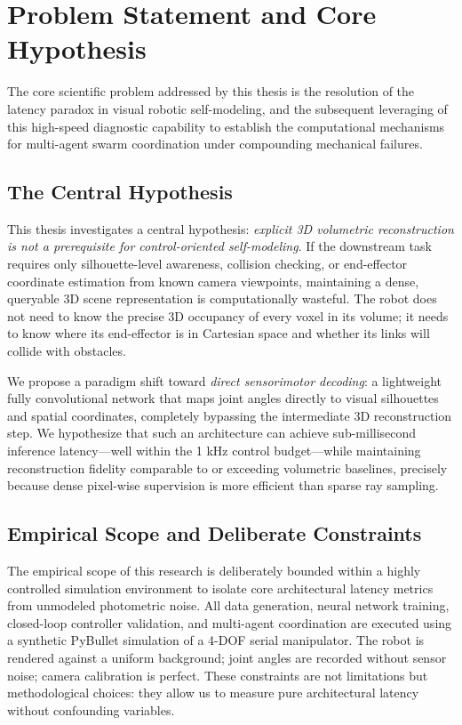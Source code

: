 \documentclass[12pt,a4paper,oneside]{report}
\begin{document}
\section{Problem Statement and Core Hypothesis}

The core scientific problem addressed by this thesis is the resolution of the latency paradox in visual robotic self-modeling, and the subsequent leveraging of this high-speed diagnostic capability to establish the computational mechanisms for multi-agent swarm coordination under compounding mechanical failures.

\subsection{The Central Hypothesis}

This thesis investigates a central hypothesis: \textit{explicit 3D volumetric reconstruction is not a prerequisite for control-oriented self-modeling}. If the downstream task requires only silhouette-level awareness, collision checking, or end-effector coordinate estimation from known camera viewpoints, maintaining a dense, queryable 3D scene representation is computationally wasteful. The robot does not need to know the precise 3D occupancy of every voxel in its volume; it needs to know where its end-effector is in Cartesian space and whether its links will collide with obstacles.

We propose a paradigm shift toward \textit{direct sensorimotor decoding}: a lightweight fully convolutional network that maps joint angles directly to visual silhouettes and spatial coordinates, completely bypassing the intermediate 3D reconstruction step. We hypothesize that such an architecture can achieve sub-millisecond inference latency—well within the 1 kHz control budget—while maintaining reconstruction fidelity comparable to or exceeding volumetric baselines, precisely because dense pixel-wise supervision is more efficient than sparse ray sampling.

\subsection{Empirical Scope and Deliberate Constraints}

The empirical scope of this research is deliberately bounded within a highly controlled simulation environment to isolate core architectural latency metrics from unmodeled photometric noise. All data generation, neural network training, closed-loop controller validation, and multi-agent coordination are executed using a synthetic PyBullet simulation of a 4-DOF serial manipulator. The robot is rendered against a uniform background; joint angles are recorded without sensor noise; camera calibration is perfect. These constraints are not limitations but methodological choices: they allow us to measure pure architectural latency without confounding variables.
\end{document}
